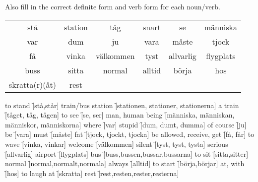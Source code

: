 \begin{flushleft}
    Also fill in the correct definite form and verb form for each noun/verb.
\end{flushleft}
\begin{center}
    \begin{tabular}{|c c c c c c|}
        \hline
        stå & station & tåg & snart & se & människa \\
        var & dum & ju & vara & måste & tjock \\
        få & vinka & välkommen & tyst & allvarlig & flygplats \\
        buss & sitta & normal & alltid & börja & hos \\
        skratta(r)(åt) & rest &&&& \\
        \hline
    \end{tabular}
\end{center}

\begin{questions}
    \begin{multicols}{2}
        \raggedcolumns
        \question to stand \f[stå,står]
        \question train/bus station \f[stationen, stationer, stationerna]
        \question a train \f[tåget, tåg, tågen]
        \question to see \f[se, ser]
        \question man, human being \f[människa, människan, människor, människorna]
        \question where \f[var]
        \question stupid \f[dum, dumt, dumma]
        \question of course \f[ju]
        \question be \f[vara]
        \question must \f[måste]
        \question fat \f[tjock, tjockt, tjocka]
        \question be allowed, receive, get \f[få, får]
        \question to wave \f[vinka, vinkar]
        \question welcome \f[välkommen]
        \question silent \f[tyst, tyst, tysta]
        \question serious \f[allvarlig]
        \question airport \f[flygplats]
        \question bus \f[buss,bussen,bussar,bussarna]
        \question to sit \f[sitta,sitter]
        \question normal \f[normal,normalt,normala]
        \question always \f[alltid]
        \question to start \f[börja,börjar]
        \question at, with \f[hos]
        \question to laugh at \f[skratta]
        \question rest \f[rest,resten,rester,resterna]
    \end{multicols}
\end{questions}
